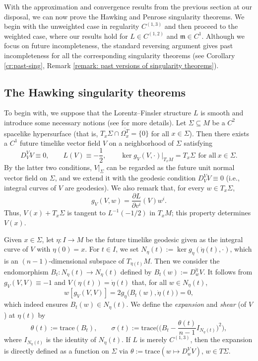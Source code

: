 \documentclass[a4paper,11pt]{article}
\numberwithin{equation}{section}
\theoremstyle{definition}
\theoremstyle{plain}
\begin{document}
With the approximation and convergence results from the previous section at our disposal, we can now prove the Hawking and Penrose singularity theorems.
We begin with the unweighted case in regularity $C^{(1,3)}$ and then proceed to the weighted case, where our results hold for $L \in C^{(1,2)}$ and $\mathfrak m \in C^1$.
Although we focus on future incompleteness, the standard reversing argument gives past incompleteness for all the corresponding singularity theorems (see Corollary \ref{cr:past-sing}, Remark \ref{remark: past versions of singularity theorems}).


\subsection{The Hawking singularity theorems}\label{ssc:Hawking}


To begin with, we suppose that the Lorentz--Finsler structure $L$ is smooth and introduce some necessary notions (see \cite{Minguzzi-LightconesFinsler,MinguzziRaychaudhuri} for more details).
Let $\Sigma \subseteq M$ be a $C^2$ spacelike hypersurface (that is, $T_x \Sigma \cap \overline{\Omega_x^T} =\{0\}$ for all $x \in \Sigma$). 
Then there exists a $C^1$ future timelike vector field $V$ on a neighborhood of $\Sigma$ satisfying
\[
D^V_V V \equiv 0, \qquad 
L(V) \equiv -\frac{1}{2}, \qquad 
\ker g_V(V,\cdot)|_{T_xM} =T_x\Sigma \,\ \text{for all}\ x \in \Sigma.
\]
By the latter two conditions, $V|_\Sigma$ can be regarded as the future unit normal vector field on $\Sigma$, and we extend it with the geodesic condition $D^V_V V \equiv 0$ (i.e., integral curves of $V$ are geodesics).
We also remark that, for every $w \in T_x\Sigma$,
\[
g_V(V,w) =\frac{\partial L}{\partial v^i}(V)w^i.
\]
Thus, $V(x)+T_x\Sigma$ is tangent to $L^{-1}(-1/2)$ in $T_xM$; this property determines $V(x)$.

Given $x \in \Sigma$, let $\eta:I \to M$ be the future timelike geodesic given as the integral curve of $V$ with $\eta(0)=x$.
For $t \in I$, we set $N_\eta(t):=\ker g_{\dot{\eta}}(\dot{\eta}(t),\cdot)$, which is an $(n-1)$-dimensional subspace of $T_{\eta(t)}M$.
Then we consider the endomorphism $B_t:N_\eta(t) \to N_\eta(t)$ defined by $B_t(w):=D_w^{\dot{\eta}} V$.
It follows from $g_V(V,V) \equiv -1$ and $V(\eta(t))=\dot{\eta}(t)$ that, for all $w \in N_\eta(t)$,
\[
w[g_V(V,V)] =2g_{\dot{\eta}}\bigl( B_t(w),\dot{\eta}(t) \bigr) =0,
\]
which indeed ensures $B_t(w)\in N_{\eta}(t)$.
We define the \emph{expansion} and \emph{shear} (of $V$) at $\eta(t)$ by
\begin{equation}\label{eq:expan}
\theta(t) :=\mathrm{trace}(B_t), \qquad 
\sigma(t) :=\mathrm{trace} \Biggl( \biggl( B_t -\frac{\theta(t)}{n-1}I_{N_{\eta}(t)} \biggr)^2 \Biggr),
\end{equation}
where $I_{N_{\eta}(t)}$ is the identity of $N_{\eta}(t)$. If $L$ is merely $C^{(1,3)}$, then the expansion is directly defined as a function on $\Sigma$ via $\theta:=\mathrm{trace}(w \mapsto D^V_wV)$, $w \in T\Sigma$.
\end{document}
